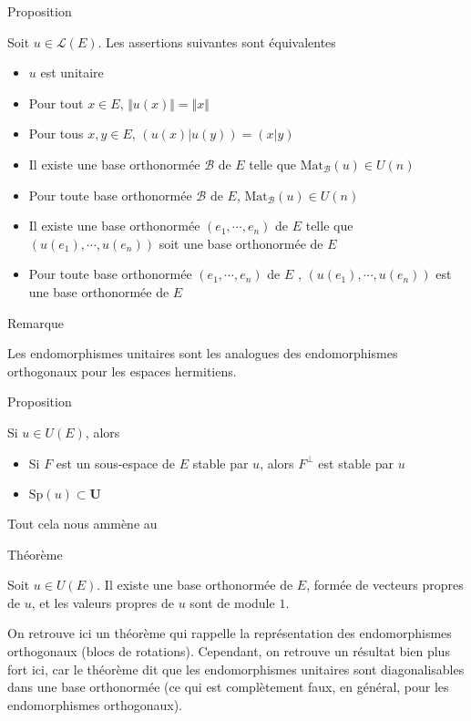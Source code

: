 \documentclass[a4paper,11pt]{article}
\newcommand{\U}{\mathbf{U}}
\newcommand{\B}{\mathcal{B}}
\renewcommand{\L}{\mathcal{L}}
\newenvironment{gbar}[1]{%
		\def\FrameCommand{{\color{#1}\vrule width 3pt }
		\colorbox{gris2}} %
		\MakeFramed{\advance\hsize -\width\FrameRestore}} %
		{\endMakeFramed}
\newenvironment{cadre}[2]{
		\begin{bclogo}[couleur = gris , barre = none , noborder = true , logo=\vspace{1em}]{
			\hspace{.14em}
			\colorbox{#1}{
				\parbox{15em}{
				\sffamily\normalsize{\color{gris}#2}
			}}
			\vspace{.2em}
		}
			\begin{gbar}{#1}
	}
	{
			\end{gbar}
		\end{bclogo}
	}
\begin{document}
\begin{cadre}{rouge}{Proposition}
Soit $u\in\L(E)$. Les assertions suivantes sont équivalentes
\begin{itemize}[label={\color{rouge}•}]
\item $u$ est unitaire
\item Pour tout $x\in E$, $\Vert u(x)\Vert=\Vert x\Vert$
\item Pour tous $x,y\in E$, $(u(x)\vert u(y))=(x\vert y)$
\item Il existe une base orthonormée $\B$ de $E$ telle que $\mathrm{Mat}_\B(u)\in U(n)$
\item Pour toute base orthonormée $\B$ de $E$, $\mathrm{Mat}_\B(u)\in U(n)$
\item Il existe une base orthonormée $(e_1,\cdots,e_n)$ de $E$ telle que $(u(e_1),\cdots,u(e_n))$ soit une base orthonormée de $E$
\item Pour toute base orthonormée $(e_1,\cdots,e_n)$ de $E$ , $(u(e_1),\cdots,u(e_n))$ est une base orthonormée de $E$
\end{itemize}
\end{cadre}

\begin{cadre}{noir}{Remarque}
Les endomorphismes unitaires sont les analogues des endomorphismes orthogonaux pour les espaces hermitiens.
\end{cadre}

\begin{cadre}{rouge}{Proposition}
Si $u\in U(E)$, alors 
\begin{itemize}[label={\color{rouge}•}]
\item Si $F$ est un sous-espace de $E$ stable par $u$, alors $F^\perp$ est stable par $u$
\item $\mathrm{Sp}(u)\subset\U$
\end{itemize}
\end{cadre}
Tout cela nous ammène au
\begin{cadre}{rouge}{Théorème}
Soit $u\in U(E)$. Il existe une base orthonormée de $E$, formée de vecteurs propres de $u$, et les valeurs propres de $u$ sont de module $1$.
\end{cadre}
On retrouve ici un théorème qui rappelle la représentation des endomorphismes orthogonaux (blocs de rotations). Cependant, on retrouve un résultat bien plus fort ici, car le théorème dit que les endomorphismes unitaires sont diagonalisables dans une base orthonormée (ce qui est complètement faux, en général, pour les endomorphismes orthogonaux).
\end{document}
